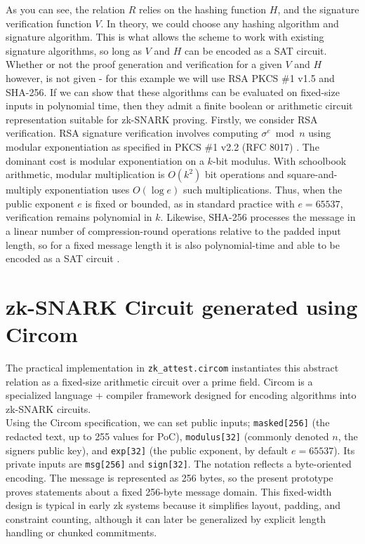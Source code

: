 \documentclass[]{article}
\begin{document}
As you can see, the relation $R$ relies on the hashing function $H$, and the signature verification function $V$. In theory, we could choose any hashing algorithm and signature algorithm. This is what allows the scheme to work with existing signature algorithms, so long as $V$ and $H$ can be encoded as a SAT circuit. Whether or not the proof generation and verification for a given $V$ and $H$ however, is not given - for this example we will use RSA PKCS \#1 v1.5 and SHA-256. If we can show that these algorithms can be evaluated on fixed-size inputs in polynomial time, then they admit a finite boolean or arithmetic circuit representation suitable for zk-SNARK proving. Firstly, we consider RSA verification. RSA signature verification involves computing $\sigma^e \bmod n$ using modular exponentiation as specified in PKCS \#1 v2.2 (RFC 8017) \cite{pkcs}. The dominant cost is modular exponentiation on a $k$-bit modulus. With schoolbook arithmetic, modular multiplication is $O(k^2)$ bit operations and square-and-multiply exponentiation uses $O(\log e)$ such multiplications. Thus, when the public exponent $e$ is fixed or bounded, as in standard practice with $e=65537$, verification remains polynomial in $k$. Likewise, SHA-256 processes the message in a linear number of compression-round operations relative to the padded input length, so for a fixed message length it is also polynomial-time and able to be encoded as a SAT circuit \cite{nist}.

\section{zk-SNARK Circuit generated using Circom}
The practical implementation in \texttt{zk\_attest.circom} instantiates this abstract relation as a fixed-size arithmetic circuit over a prime field. Circom is a specialized language + compiler framework designed for encoding algorithms into zk-SNARK circuits.\cite{circom_background}\\

Using the Circom specification, we can set public inputs; \texttt{masked[256]} (the redacted text, up to 255 values for PoC), \texttt{modulus[32]} (commonly denoted $n$, the signers public key), and \texttt{exp[32]} (the public exponent, by default $e=65537$). Its private inputs are \texttt{msg[256]} and \texttt{sign[32]}. The notation reflects a byte-oriented encoding. The message is represented as 256 bytes, so the present prototype proves statements about a fixed 256-byte message domain. This fixed-width design is typical in early zk systems because it simplifies layout, padding, and constraint counting, although it can later be generalized by explicit length handling or chunked commitments.
\end{document}
